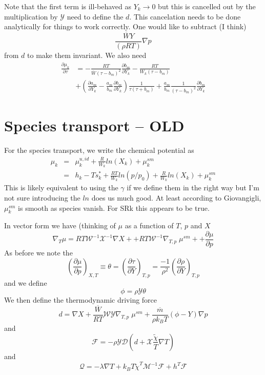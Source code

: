 \documentclass[11pt]{article}
\newcommand{\MarginPar}[1]{\marginpar{%
\vskip-\baselineskip %
\raggedright\tiny\sffamily
\hrule\smallskip{\color{red}#1}\par\smallskip\hrule}}
\newcommand{\HeatFlux}{\boldsymbol{\mathcal{Q}}}
\newcommand{\SpeciesFlux}{\boldsymbol{\mathcal{F}}}
\newcommand{\mbar}{\overline{m}}
\newcommand{\wbar}{\overline{W}}
\begin{document}
Note that the first term is ill-behaved as $Y_k \rightarrow 0$ but this is cancelled out by the multiplication by
$\mathcal{Y}$ need to define the $d$.  This cancelation needs to be done analytically for things to work correctly.
One would like to subtract (I think)
\[
\frac{\wbar Y} { (\rho R T)} \nabla p
\]
from $d$ to make them invariant.  
We also need
\begin{align}
\frac{\partial \mu_k}{\partial \tau} &=  
-\frac{RT}{\wbar (\tau-b_m)^2} \frac{\partial b_m}{\partial Y_k}
-\frac{RT}{W_k (\tau-b_m)} \nonumber \\
&+ \left( \frac{\partial a_m}{\partial Y_k} - \frac{a_m}{b_m} \frac{\partial b_m}{\partial Y_k} \right )
\frac{1}{\tau ( \tau+b_m)}
+ \frac{a_m}{b_m} \frac{1}{(\tau - b_m)^2} \frac{\partial b_m}{\partial Y_k}
\end{align}

\section{Species transport -- OLD}
\MarginPar{need to fix this}

For the species transport, we write the chemical potential as
\begin{eqnarray}
\label{eq:muk_sm}
\mu_k &=& \mu_k^{u,id} + \frac{R}{W_k} ln(X_k)  +  \mu_k^{sm} \\
 &=& h_k - T s_k^* + \frac{R T}{W_k} ln(p/p_0) + \frac{R}{W_k} ln(X_k) + \mu_k^{sm}
\end{eqnarray}
This is likely equivalent to using the $\gamma$ if we define them in the right way but I'm not sure
introducing the $ln$ does us much good.
At least according to Giovangigli, $\mu_k^{sm}$ is smooth as species vanish.  For SRk this appears to be true.

In vector form we have (thinking of $\mu$ as a function of $T$, $p$ and $X$
\begin{equation}
\nabla_T \mu
= R T \mathcal{W}^{-1} \mathcal{X}^{-1} \nabla X +
+ R T \mathcal{W}^{-1} \nabla_{T,p} \; \mu^{sm} +
+ \frac{\partial \mu}{\partial p}
\end{equation}
As before we note the
\[
\left(\frac{\partial \mu}{\partial p}\right)_{X,T} \equiv \theta = \left(\frac{ \partial \tau}{\partial Y}\right)_{T,p}
 =
\frac{-1}{\rho^2}\left (\frac{\partial \rho}{\partial Y} \right)_{T,p}
\]
and we define
\[
\label{eq:transp_gradp_multiplier}
\phi = \rho \mathcal{Y} \theta
\]
We then define the thermodynamic driving force
\[
d = \nabla X  + \frac{\overline{W}}{R T} \mathcal{W} \mathcal{Y} \nabla_{T,p} \; \mu^{sm}  + \frac{\mbar}{\rho k_B T} (\phi - Y) \nabla p
\]
and
\[
\mathcal{F} = - \rho \mathcal{Y} \mathcal{D} ( d + \mathcal{X} \frac{ \tilde{\chi}}{T} \nabla T)
\]
and
\[
\HeatFlux = - \lambda \nabla T + k_B T {\tilde{\chi}}^T \mathcal{M}^{-1} \SpeciesFlux + h^T \SpeciesFlux
\]
\end{document}
